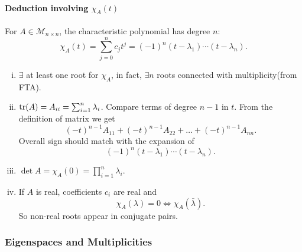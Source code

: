 \documentclass[a4paper]{article}
\begin{document}
    \paragraph{Deduction involving $ \chi_A(t) $}
    For $ A\in \mathcal{M}_{n\times n} $, the characteristic
    polynomial has degree $n$:
    \[
      \chi_A(t)=\sum_{j=0}^{n}c_jt^j=(-1)^n(t-\lambda_1)\cdots(t-\lambda_n)
    .\]
    \begin{enumerate}[(i)]
      \item $ \exists  $ at least one root for $ \chi_A $, in fact, $
        \exists n$ roots connected with multiplicity(from FTA).
      \item $ \tr(A)=A_{ii}=\sum_{i=1}^{n}\lambda_i $. Compare terms
        of degree $n-1$ in $t$. From the definition of matrix we get
        \[
          (-t)^{n-1} A_{11}+(-t)^{n-1} A_{22}+\ldots+(-t)^{n-1} A_{n n}
        .\]
        Overall sign should match with the expansion of
        \[
          (-1)^n(t-\lambda_1)\cdots(t-\lambda_n)
        .\]
      \item $ \det A = \chi_A(0)=\prod_{i=1}^{n}\lambda_i $.
      \item If $A$ is real, coefficients $c_i$ are real and
        \[
          \chi_A(\lambda)=0 \Longleftrightarrow \chi_A(\bar{\lambda})
        .\]
        So non-real roots appear in conjugate pairs.
    \end{enumerate}
    \subsubsection{Eigenspaces and Multiplicities}
\end{document}
